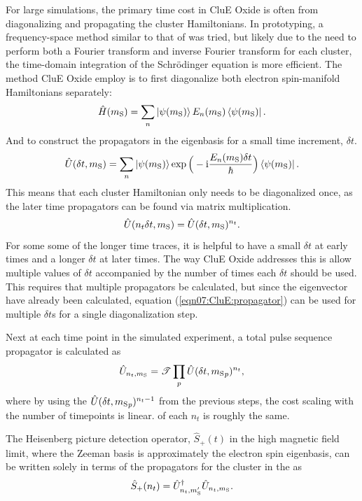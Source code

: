 \documentclass{book}
\begin{document}
For large simulations, the primary time cost in CluE Oxide is often from 
diagonalizing and propagating the cluster Hamiltonians.  
In prototyping, a frequency-space method similar to that of \cite{2009_Stoll}
was tried, but likely due to the need to perform both 
a Fourier transform and inverse Fourier transform for each cluster, 
the time-domain integration of the Schr{\"o}dinger equation is more efficient.
The method CluE Oxide employ is to first diagonalize both
electron spin-manifold Hamiltonians separately:
%
\begin{equation}
\hat{H}(m_{\mathrm{S}}) 
= 
\sum_{n } 
\ket{\psi(m_{\mathrm{S}})}
E_n(m_{\mathrm{S}})
\bra{\psi(m_{\mathrm{S}})}
.
\end{equation}
% 
And to construct the propagators in the eigenbasis for a small time increment,
$\delta t$.
%
\begin{equation} \label{eqn07:CluE:propagator}
\hat{U}(\delta t, m_{\mathrm{S}}) 
= 
\sum_{n } 
\ket{\psi(m_{\mathrm{S}})}
\exp \Big(-\mathrm{i} \frac{E_n(m_{\mathrm{S}})  \delta t }{\hbar} \Big)
\bra{\psi(m_{\mathrm{S}})}
.
\end{equation}
% 
This means that each cluster Hamiltonian only needs to be diagonalized once, 
as the later time propagators can be found via matrix multiplication. 
%
\begin{equation}
\hat{U}(n_t \delta t, m_{\mathrm{S}}) = 
\hat{U}(\delta t, m_{\mathrm{S}})^{n_t}. 
\end{equation}
%
For some some of the longer time traces, it is helpful to have a small 
$\delta t$ at early times and a longer $\delta t$ at later times.  
The way CluE Oxide addresses this is allow multiple values of $\delta t$ 
accompanied by the number of times each $\delta t$ should be used.  
This requires that multiple propagators be calculated, 
but since the eigenvector have already been
calculated, equation (\ref{eqn07:CluE:propagator}) can be used for multiple
$\delta t$s for a single diagonalization step.

Next at each time point in the simulated experiment, a total  pulse sequence
propagator is calculated as
%
\begin{equation}
\hat{U}_{n_t,m_{\mathrm{S}}} = 
\mathscr{T} \prod_{p} \hat{U}(\delta t, {m_{\mathrm{S}}}_p)^{n_t}
,
\end{equation}
%
where by using the $\hat{U}(\delta t, {m_{\mathrm{S}}}_p)^{n_t-1}$ from the
previous steps, the cost scaling with the number of timepoints is linear. 
of each $n_t$ is roughly the same. 

The Heisenberg picture detection operator, $\hat{S}_{+}(t)$ in the high 
magnetic field limit, where the Zeeman basis is approximately the electron
spin eigenbasis, can be written solely in terms of the propagators for the
cluster in the as
%
\begin{equation}
\hat{S}_+(n_t) = 
\hat{U}_{n_t,m_{\mathrm{S}}'}^{\dagger} \hat{U}_{n_t,m_{\mathrm{S}}}  
.
\end{equation}
%
\end{document}
